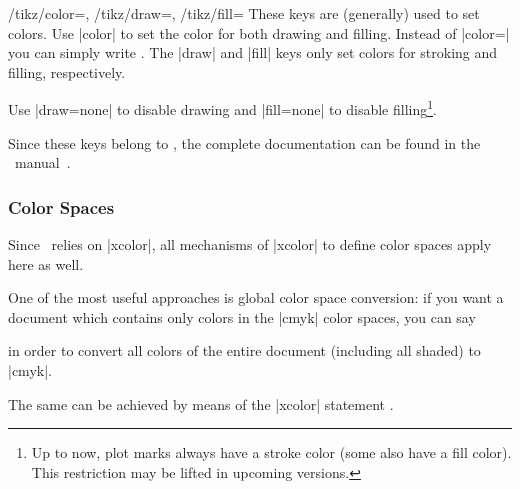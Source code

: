 \begin{keylist}{
	/tikz/color=,
	/tikz/draw=,
	/tikz/fill=}
	These keys are (generally) used to set colors. Use |color| to set the color for both drawing and filling. Instead of |color=| you can simply write . The |draw| and |fill| keys only set colors for stroking and filling, respectively.

	Use |draw=none| to disable drawing and |fill=none| to disable filling\footnote{Up to now, plot marks always have a stroke color (some also have a fill color). This restriction may be lifted in upcoming versions.}.%

	Since these keys belong to \Tikz, the complete documentation can be found in the \Tikz\ manual~\cite[Section ``Specifying a Color'']{tikz}.
\end{keylist}

\subsubsection{Color Spaces}

Since \PGFPlots\ relies on |xcolor|, all mechanisms of |xcolor| to define color spaces apply here as well.

One of the most useful approaches is global color space conversion: if you want a document which contains only colors in the |cmyk| color spaces, you can say

\begin{codeexample}
\usepackage[cmyk]{xcolor}
\usepackage{pgfplots}
\end{codeexample}
\noindent in order to convert all colors of the entire document (including all shaded) to |cmyk|.

The same can be achieved by means of the |xcolor| statement \declareandlabel{\selectcolormodel}.
\begin{codeexample}
\end{codeexample}


